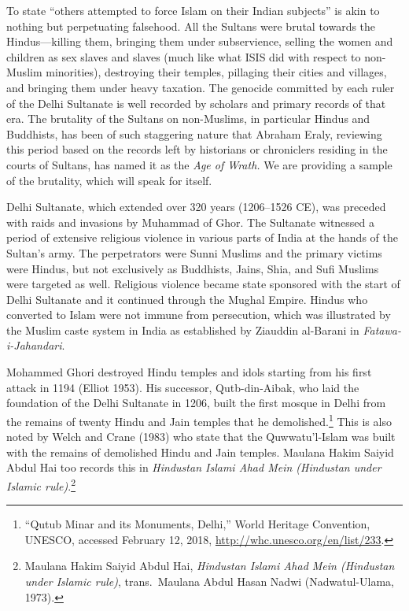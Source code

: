 To state “others attempted to force Islam on their Indian subjects” is akin to nothing but perpetuating falsehood. All the Sultans were brutal towards the Hindus—killing them, bringing them under subservience, selling the women and children as sex slaves and slaves (much like what ISIS did with respect to non-Muslim minorities), destroying their temples, pillaging their cities and villages, and bringing them under heavy taxation. The genocide committed by each ruler of the Delhi Sultanate is well recorded by scholars and primary records of that era. The brutality of the Sultans on non-Muslims, in particular Hindus and Buddhists, has been of such staggering nature that Abraham Eraly, reviewing this period based on the records left by historians or chroniclers residing in the courts of Sultans, has named it as the \textit{Age of Wrath.} We are providing a sample of the brutality, which will speak for itself. 

Delhi Sultanate, which extended over 320 years (1206--1526 CE), was preceded with raids and invasions by Muhammad of Ghor. The Sultanate witnessed a period of extensive religious violence in various parts of India at the hands of the Sultan’s army. The perpetrators were Sunni Muslims and the primary victims were Hindus, but not exclusively as Buddhists, Jains, Shia, and Sufi Muslims were targeted as well. Religious violence became state sponsored with the start of Delhi Sultanate and it continued through the Mughal Empire. Hindus who converted to Islam were not immune from persecution, which was illustrated by the Muslim caste system in India as established by Ziauddin al-Barani in\textit{ Fatawa-i-Jahandari}.

Mohammed Ghori destroyed Hindu temples and idols starting from his first attack in 1194 (Elliot 1953). His successor, Qutb-din-Aibak, who laid the foundation of the Delhi Sultanate in 1206, built the first mosque in Delhi from the remains of twenty Hindu and Jain temples that he demolished.\footnote{“Qutub Minar and its Monuments, Delhi,” World Heritage Convention, UNESCO, accessed February 12, 2018, \url{http://whc.unesco.org/en/list/233}.} This is also noted by Welch and Crane (1983) who state that the Quwwatu'l-Islam was built with the remains of demolished Hindu and Jain temples. Maulana Hakim Saiyid Abdul Hai too records this in \textit{Hindustan Islami Ahad Mein (Hindustan under Islamic rule)}.\footnote{Maulana 	Hakim Saiyid Abdul Hai, \textit{Hindustan Islami Ahad Mein (Hindustan under Islamic rule)}, trans.\ Maulana Abdul Hasan Nadwi (Nadwatul-Ulama, 1973).} 

